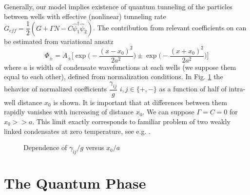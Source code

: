 \documentclass[aps, pre, preprint, groupedaddress, superscriptaddress, showkeys, showpacs] {revtex4-1}
\begin{document}
Generally, our model implies existence of quantum tunneling of the particles between wells with effective (nonlinear) tunneling rate $G_{eff} = \dfrac{1}{2}(G+\Gamma N - C\hat{\psi}_1^\dag\hat{\psi}_2)$.
The contribution from relevant coefficients on can be estimated from variational ansatz
%
\begin{equation}
\Phi_{\pm} = A_{\pm} \Big[ \exp \Big( -\dfrac{(x - x_0)^2}{2 a^2} \Big) \pm \exp \Big( -\dfrac{(x + x_0)^2}{2 a^2} \Big) \Big]
\label{eq:two_modes_eq}
\end{equation}
%
where $a$ is width of condensate wavefunctions at each wells (we suppose them equal to each other), defined from normalization conditions.
In Fig. \ref{pic:gamma_pm_vs_g} the behavior of normalized coefficients $\dfrac{\gamma_{ij}}{g}$ $i,j \in \{+,-\}$ as a function of half of intra-well distance $x_0$ is shown.
It is important that at differences between them rapidly vanishes with increasing of distance $x_0$.
We can suppose $\Gamma = C = 0$ for $x_0 >> a$.
This limit exactly corresponds to familiar problem of two weakly linked condensates at zero temperature, see e.g. \cite{Aleiner, Shelykh_2008, Borgh_2010, Raghavan}.
%
\begin{figure}[ht]
\caption{Dependence of $\gamma_{ij} / g$ versus $x_0 / a$ \label{pic:gamma_pm_vs_g}}
\end{figure}
%

\section{The Quantum Phase \label{sec:quantum_phase}}
\end{document}
